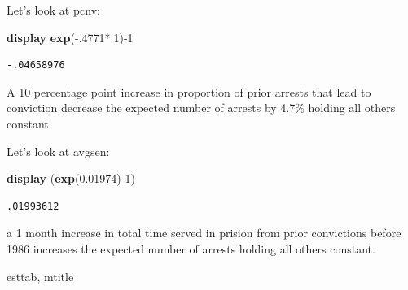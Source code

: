 \documentclass[
]{book}
\newenvironment{Shaded}{\begin{snugshade}}{\end{snugshade}}
\newcommand{\FunctionTok}[1]{\textcolor[rgb]{0.13,0.29,0.53}{\textbf{#1}}}
\newcommand{\KeywordTok}[1]{\textcolor[rgb]{0.13,0.29,0.53}{\textbf{#1}}}
\newcommand{\NormalTok}[1]{#1}
\begin{document}
Let's look at pcnv:

\begin{Shaded}
\begin{Highlighting}[]
\KeywordTok{display} \FunctionTok{exp}\NormalTok{({-}.4771*.1){-}1}
\end{Highlighting}
\end{Shaded}

\begin{verbatim}
-.04658976
\end{verbatim}

A 10 percentage point increase in proportion of prior arrests that lead to conviction decrease the expected number of arrests by 4.7\% holding all others constant.

Let's look at avgsen:

\begin{Shaded}
\begin{Highlighting}[]
\KeywordTok{display}\NormalTok{ (}\FunctionTok{exp}\NormalTok{(0.01974){-}1)}
\end{Highlighting}
\end{Shaded}

\begin{verbatim}
.01993612
\end{verbatim}

a 1 month increase in total time served in prision from prior convictions before 1986 increases the expected number of arrests holding all others constant.

\begin{Shaded}
\begin{Highlighting}[]
\NormalTok{esttab, mtitle}
\end{Highlighting}
\end{Shaded}
\end{document}
